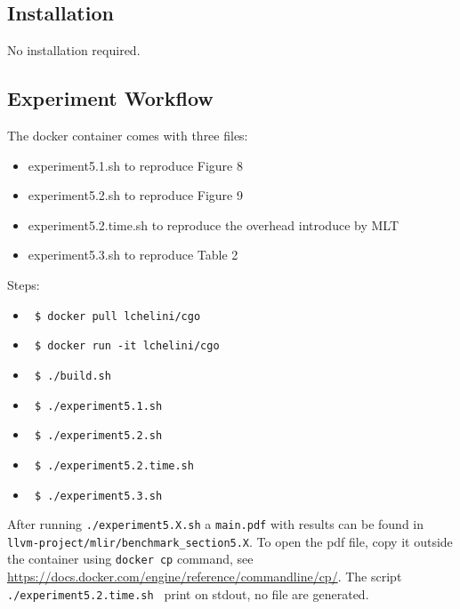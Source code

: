 {%

\subsection{Installation}

No installation required.

\subsection{Experiment Workflow}
The docker container comes with three files:
\begin{itemize}
\item experiment5.1.sh to reproduce Figure 8
\item experiment5.2.sh to reproduce Figure 9
\item experiment5.2.time.sh to reproduce the overhead introduce by MLT
\item experiment5.3.sh to reproduce Table 2
\end{itemize}

Steps:
\begin{itemize}
  \item \texttt{ \$ docker pull lchelini/cgo }
  \item \texttt{ \$ docker run -it lchelini/cgo }
  \item \texttt{ \$ ./build.sh }
  \item \texttt{ \$ ./experiment5.1.sh } 
  \item \texttt{ \$ ./experiment5.2.sh }
  \item \texttt{ \$ ./experiment5.2.time.sh } 
  \item \texttt{ \$ ./experiment5.3.sh } 
\end{itemize}
After running \texttt{./experiment5.X.sh} a \texttt{main.pdf} with results can
be found in \texttt{llvm-project/mlir/benchmark\_section5.X}.  To open the pdf
file, copy it outside the container using \texttt{docker cp} command, see
\url{https://docs.docker.com/engine/reference/commandline/cp/}. The script
\texttt{ ./experiment5.2.time.sh } print on stdout, no file are generated.

}
